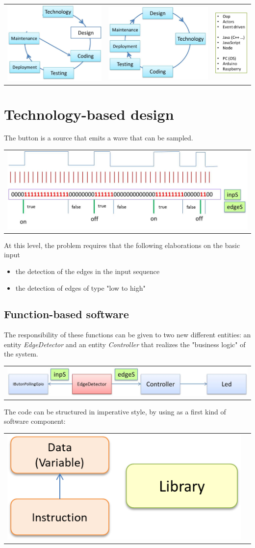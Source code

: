 \documentclass[10pt,a4paper,openright,twoside]{C:/Didattica/git/lab2014Bo/it.unibo.iss2015intro/docsInternal/contents/llncs}
\newcommand{\code}[1]{{\color{blue}{\texttt{#1}}}}
\begin{document}
\begin{tabular}{ | c | c | c | }
     \includegraphics[scale = 0.35]{img/introDesign1.jpg} & \includegraphics[scale = 0.35]{img/introDesign2.jpg} & \includegraphics[scale = 0.35]{img/introDesignTecno.jpg}
\end{tabular}


\newpage 
\section{Technology-based design}

The button is a source that emits a wave that can be sampled. 
\medskip 

\begin{tabular}{ c }
     \includegraphics[scale = 0.45]{img/buttonLedWave.jpg}
\end{tabular}

 

At this level, the problem requires that the following elaborations on the basic input 
\begin{itemize}
\item the detection of the edges in the input sequence
\item the detection of edges of type "low to high"  
\end{itemize}

\subsection{Function-based software}
The responsibility of these functions can be given to two new different entities: an entity \textit{EdgeDetector} and an entity \textit{Controller} that realizes the "business logic" of the system. 

\begin{tabular}{ c }
     \includegraphics[scale = 0.55]{img/buttonLedLogic0.jpg}
\end{tabular}


The code can be structured in imperative style, by using \code{functions} as a first kind of software component:

\begin{tabular}{|c|c|}
\hline 
\includegraphics[scale = 0.4]{img/c0.png} &  \includegraphics
\end{tabular}
\end{document}
